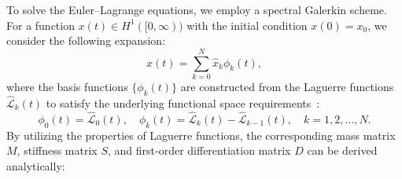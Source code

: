 \documentclass[a4paper,fleqn, 12pt]{cas-sc}
\newcommand{\LaF}{\widehat{\mathscr{L}}}
\numberwithin{table}{section}
\begin{document}
To solve the Euler--Lagrange equations, we employ a spectral Galerkin scheme. For a function $x(t) \in H^1([0, \infty))$ with the initial condition $x(0) = x_0$, we consider the following expansion:
\begin{equation}
    x(t) = \sum_{k=0}^{N} \hat{x}_k \phi_k(t),
\end{equation}
where the basis functions $\{\phi_k(t)\}$ are constructed from the Laguerre functions $\LaF_k(t)$ to satisfy the underlying functional space requirements~\cite{ChenShenYu2012NewSpectral}:
\[
    \phi_0(t) = \LaF_0(t), \quad \phi_k(t) = \LaF_k(t) - \LaF_{k-1}(t), \quad k = 1, 2, \ldots, N.
\]
By utilizing the properties of Laguerre functions, the corresponding mass matrix $M$, stiffness matrix $S$, and first-order differentiation matrix $D$ can be derived analytically:
\end{document}
